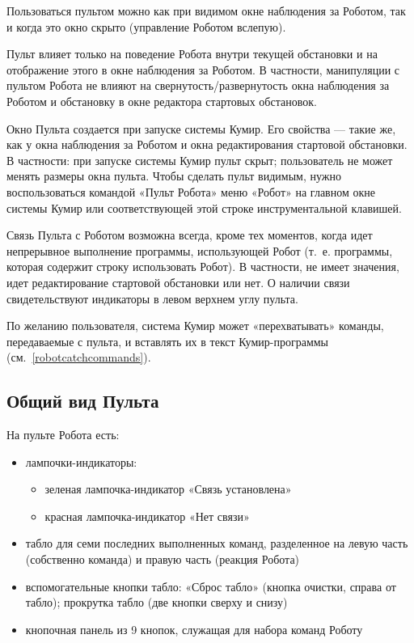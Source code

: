 Пользоваться пультом можно как при видимом окне наблюдения за Роботом, так и когда это окно скрыто (управление Роботом вслепую).

Пульт влияет только на поведение Робота внутри текущей обстановки и на отображение этого в окне наблюдения за Роботом.  В частности, манипуляции с пультом Робота не влияют на свернутость/развернутость окна наблюдения за Роботом и обстановку в окне редактора стартовых обстановок.

Окно Пульта создается при запуске системы Кумир.  Его свойства --- такие же, как у окна наблюдения за Роботом  и окна редактирования стартовой обстановки.  В частности: при запуске системы Кумир пульт скрыт; пользователь не может менять размеры окна пульта. Чтобы сделать пульт видимым, нужно воспользоваться командой «Пульт Робота» меню «Робот» на главном окне системы Кумир или соответствующей этой строке инструментальной клавишей.

Связь Пульта с Роботом возможна всегда, кроме тех моментов, когда идет непрерывное выполнение программы, использующей Робот (т.~е. программы, которая содержит строку \textsf{использовать Робот}). В частности, не имеет значения, идет редактирование стартовой обстановки или нет. О наличии связи свидетельствуют индикаторы в левом верхнем углу пульта.

По желанию пользователя, система Кумир может «перехватывать» команды, передаваемые с пульта, и вставлять их в текст Кумир-программы (см.~\ref{robotcatchcommands}).

\subsection{Общий вид Пульта}

На пульте Робота есть:
\begin{itemize}
\item лампочки-индикаторы:
	\begin{itemize}
	\item зеленая лампочка-индикатор «Связь установлена»
	\item красная лампочка-индикатор «Нет связи»
	\end{itemize}
\item табло для семи последних выполненных команд, разделенное на левую часть (собственно команда) и правую часть (реакция Робота)
\item вспомогательные кнопки табло: «Сброс табло» (кнопка очистки, справа от табло); прокрутка табло (две кнопки сверху и снизу)
\item кнопочная панель из 9 кнопок, служащая для набора команд Роботу
\end{itemize}

